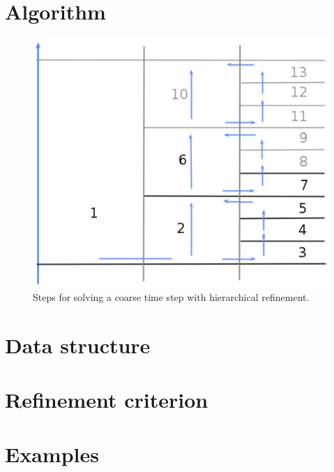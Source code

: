 \section{Algorithm}


\begin{figure}
    \centering
    \includegraphics[width=.8\textwidth]{img/multigrid/multigrid_steps.png}
    \caption{Steps for solving a coarse time step with hierarchical refinement.}
    \label{multigrid_steps}
\end{figure}


\section{Data structure}


\section{Refinement criterion}


\section{Examples}



